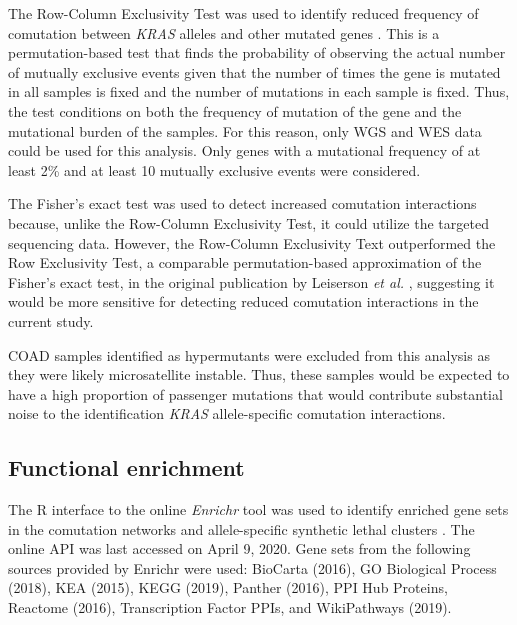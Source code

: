 \documentclass[english, 10pt, letterpaper]{article}
\newcommand{\KRAS}{\emph{KRAS}}
\begin{document}
The Row-Column Exclusivity Test was used to identify reduced frequency of comutation between \KRAS{} alleles and other mutated genes \cite{Leiserson2016}.
This is a permutation-based test that finds the probability of observing the actual number of mutually exclusive events given that the number of times the gene is mutated in all samples is fixed and the number of mutations in each sample is fixed.
Thus, the test conditions on both the frequency of mutation of the gene and the mutational burden of the samples.
For this reason, only WGS and WES data could be used for this analysis.
Only genes with a mutational frequency of at least 2\% and at least 10 mutually exclusive events were considered.

The Fisher's exact test was used to detect increased comutation interactions because, unlike the Row-Column Exclusivity Test, it could utilize the targeted sequencing data.
However, the Row-Column Exclusivity Text outperformed the Row Exclusivity Test, a comparable permutation-based approximation of the Fisher's exact test, in the original publication by Leiserson \emph{et al.} \cite{Leiserson2016}, suggesting it would be more sensitive for detecting reduced comutation interactions in the current study.

COAD samples identified as hypermutants were excluded from this analysis as they were likely microsatellite instable.
Thus, these samples would be expected to have a high proportion of passenger mutations that would contribute substantial noise to the identification \KRAS{} allele-specific comutation interactions.


\subsection*{Functional enrichment}
The R interface to the online \emph{Enrichr} tool was used to identify enriched gene sets in the comutation networks and allele-specific synthetic lethal clusters \cite{Chen2013, Kuleshov2016Enrichr:Update., R-enrichR}.
The online API was last accessed on April 9, 2020.
Gene sets from the following sources provided by Enrichr were used: BioCarta (2016), GO Biological Process (2018), KEA (2015), KEGG (2019), Panther (2016), PPI Hub Proteins, Reactome (2016), Transcription Factor PPIs, and WikiPathways (2019).
\end{document}
